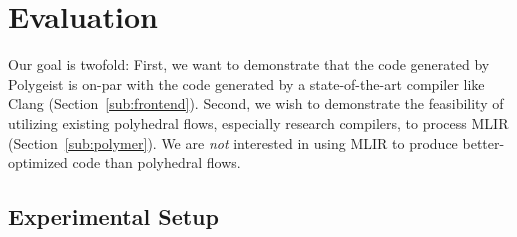 \documentclass[sigplan]{acmart}
\newcommand{\icode}[1]{{\texttt {#1}}}
\newcommand{\tool}{Polygeist\xspace}
\begin{document}


\section{Evaluation}
Our goal is twofold: First, we want to demonstrate that the code generated by \tool is on-par with the code generated by a state-of-the-art compiler like Clang (Section~\ref{sub:frontend}). Second, we wish to demonstrate the feasibility of utilizing existing polyhedral flows, especially research compilers, to process MLIR (Section~\ref{sub:polymer}).
We are \emph{not} interested in using MLIR to produce better-optimized code than polyhedral flows.

\subsection{Experimental Setup}

\begin{table}
\begin{center}
\end{center}
\caption{Hardware setup.}
\label{table:arch}
\end{table}
\end{document}
